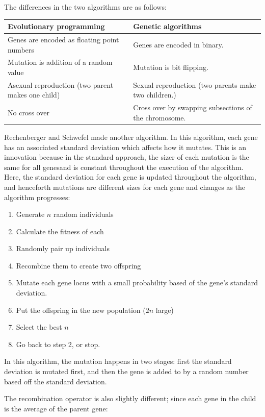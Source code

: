 The differences in the two algorithms are as follows:

\begin{center}
  \begin{tabularx}{0.8\textwidth}{X|X}
    \textbf{Evolutionary programming} & \textbf{Genetic algorithms}\\ \hline
    Genes are encoded as floating point numbers & Genes are encoded in binary.\\
    Mutation is addition of a random value & Mutation is bit flipping.\\
    Asexual reproduction (two parent makes one child) & Sexual reproduction (two
    parents make two children.)\\
    No cross over & Cross over by swapping subsections of the chromosome.
  \end{tabularx}
\end{center}

Rechenberger and Schwefel made another algorithm. In this algorithm,
each gene has an associated standard deviation which affects how it
mutates. This is an innovation because in the standard approach, the
sizer of each mutation is the same for all genesand is constant
throughout the execution of the algorithm. Here, the standard
deviation for each gene is updated throughout the algorithm, and
henceforth mutations are different sizes for each gene and changes as
the algorithm progresses:

\begin{enumerate}
  \item Generate $n$ random individuals
  \item Calculate the fitness of each
  \item Randomly pair up individuals
  \item Recombine them to create two offspring
  \item Mutate each gene locus with a small probability based of the
  gene's standard deviation.
  \item Put the offspring in the new population ($2n$ large)
  \item Select the best $n$
  \item Go back to step 2, or stop.
\end{enumerate}

In this algorithm, the mutation happens in two stages: first the
standard deviation is mutated first, and then the gene is added to by
a random number based off the standard deviation.

The recombination operator is also slightly different; since each gene
in the child is the average of the parent gene:

